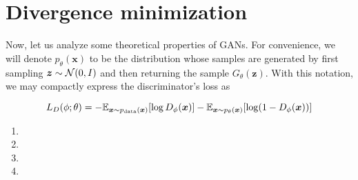 \section{Divergence minimization}

Now, let us analyze some theoretical properties of GANs. For convenience, we will denote $p_{\theta}(\bm{x})$ 
to be the distribution whose samples are generated by first sampling $\bm{z} \sim \mathcal{N}(0,I)$ and then 
returning the sample $G_{\theta}(\bm{z})$. With this notation, we may compactly express the discriminator’s loss as

\begin{equation} \label{eq:12}
    L_{D}(\phi;\theta) = - \mathbb{E}_{\bm{x} \sim p_{\text{data}}(\bm{x})} [\log D_{\phi}(\bm{x})] - \mathbb{E}_{\bm{x}\sim p_{\theta}(\bm{x})}[\log (1 - D_{\phi}(\bm{x}))]
\end{equation}

\begin{enumerate}[label=(\alph*)]
    \item 

    \item 

    \item 

    \item 
    
\end{enumerate}